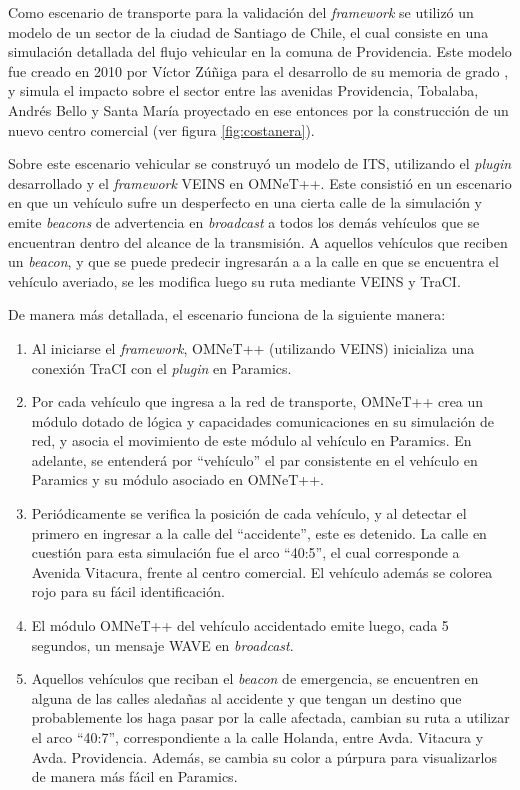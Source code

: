 Como escenario de transporte para la validación del \emph{framework} se utilizó un modelo de un sector de la ciudad de Santiago de Chile, el cual consiste en una simulación detallada del flujo vehicular en la comuna de Providencia. Este modelo fue creado en 2010 por Víctor Zúñiga para el desarrollo de su memoria de grado \autocite{zuniga}, y simula el impacto sobre el sector entre las avenidas Providencia, Tobalaba, Andrés Bello y Santa María proyectado en ese entonces por la construcción de un nuevo centro comercial (ver figura \ref{fig:costanera}).

Sobre este escenario vehicular se construyó un modelo de ITS, utilizando el \emph{plugin} desarrollado y el \emph{framework} VEINS en OMNeT++. Este consistió en un escenario en que un vehículo sufre un desperfecto en una cierta calle de la simulación y emite \emph{beacons} de advertencia en \emph{broadcast} a todos los demás vehículos que se encuentran dentro del alcance de la transmisión. A aquellos vehículos que reciben un \emph{beacon}, y que se puede predecir ingresarán a a la calle en que se encuentra el vehículo averiado, se les modifica luego su ruta mediante VEINS y TraCI.

De manera más detallada, el escenario funciona de la siguiente manera:

\begin{enumerate}
    \item Al iniciarse el \emph{framework}, OMNeT++ (utilizando VEINS) inicializa una conexión TraCI con el \emph{plugin} en Paramics.
    \item Por cada vehículo que ingresa a la red de transporte, OMNeT++ crea un módulo dotado de lógica y capacidades comunicaciones en su simulación de red, y asocia el movimiento de este módulo al vehículo en Paramics. En adelante, se entenderá por ``vehículo'' el par consistente en el vehículo en Paramics y su módulo asociado en OMNeT++.
    \item Periódicamente se verifica la posición de cada vehículo, y al detectar el primero en ingresar a la calle del ``accidente'', este es detenido. La calle en cuestión para esta simulación fue el arco ``40:5'', el cual corresponde a Avenida Vitacura, frente al centro comercial. El vehículo además se colorea rojo para su fácil identificación.
    \item El módulo OMNeT++ del vehículo accidentado emite luego, cada 5 segundos, un mensaje WAVE \autocite{80211wave} en \emph{broadcast}.
    \item Aquellos vehículos que reciban el \emph{beacon} de emergencia, se encuentren en alguna de las calles aledañas al accidente y que tengan un destino que probablemente los haga pasar por la calle afectada, cambian su ruta a utilizar el arco ``40:7'', correspondiente a la calle Holanda, entre Avda. Vitacura y Avda. Providencia. Además, se cambia su color a púrpura para visualizarlos de manera más fácil en Paramics.
\end{enumerate}

